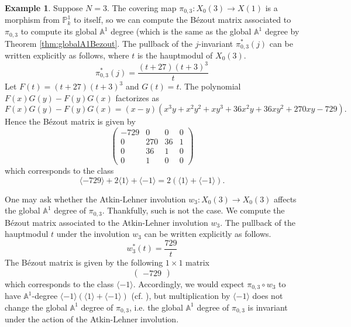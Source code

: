 \documentclass[12pt, reqno]{amsart}
\theoremstyle{definition}
\newtheorem{example}[theorem]{Example}
\newcommand{\A}{\mathbb{A}} %
\newcommand{\Proj}{\mathbb{P}} %
\begin{document}
\begin{example}
Suppose $N = 3$. The covering map $\pi_{0,3}:X_0(3) \to X(1)$ is a morphism from $\Proj^1_k$ to itself, so we can compute the B\'ezout matrix associated to $\pi_{0,3}$ to compute its global $\A^1$ degree (which is the same as the global $\A^1$ degree by Theorem \ref{thm:globalA1Bezout}. The pullback of the $j$-invariant $\pi_{0,3}^*(j)$ can be written explicitly as follows, where $t$ is the hauptmodul of $X_0(3)$.
\begin{equation*}
    \pi_{0,3}^*(j) = \frac{(t+27)(t + 3)^3}{t}
\end{equation*}
Let $F(t) = (t+27)(t+3)^3$ and $G(t) = t$. The polynomial $F(x)G(y) - F(y)G(x)$ factorizes as
\begin{equation*}
    F(x) G(y) - F(y) G(x) = (x-y)(x^3y + x^2y^2 + xy^3 + 36x^2y + 36xy^2 + 270xy - 729).
\end{equation*}
Hence the B\'ezout matrix is given by
\begin{equation*}
    \begin{pmatrix} -729 & 0 & 0 & 0 \\ 0 & 270 & 36 & 1 \\ 0 & 36 & 1 & 0 \\ 0 & 1 & 0 & 0 \end{pmatrix}
\end{equation*}
which corresponds to the class
\begin{equation*}
    \langle -729 \rangle + 2 \langle 1 \rangle + \langle -1 \rangle = 2(\langle 1 \rangle + \langle -1 \rangle).
\end{equation*}

One may ask whether the Atkin-Lehner involution $w_3: X_0(3) \to X_0(3)$ affects the global $\A^1$ degree of $\pi_{0,3}$. Thankfully, such is not the case. We compute the B\'ezout matrix associated to the Atkin-Lehner involution $w_3$. The pullback of the hauptmodul $t$ under the involution $w_3$ can be written explicitly as follows.
\begin{equation*}
    w_3^*(t) = \frac{729}{t}
\end{equation*}
The B\'ezout matrix is given by the following $1 \times 1$ matrix
\begin{equation*}
    \begin{pmatrix} -729 \end{pmatrix}
\end{equation*}
which corresponds to the class $\langle -1 \rangle$. Accordingly, we would expect $\pi_{0,3} \circ w_3$ to have $\A^1$-degree $\langle -1 \rangle ( \langle 1 \rangle + \langle -1 \rangle)$ (cf. \cite[Lemma 4.8]{cazanave}), but multiplication by $\langle -1 \rangle$ does not change the global $\A^1$ degree of $\pi_{0,3}$, i.e. the global $\A^1$ degree of $\pi_{0,3}$ is invariant under the action of the Atkin-Lehner involution. 
\end{example}
\end{document}
